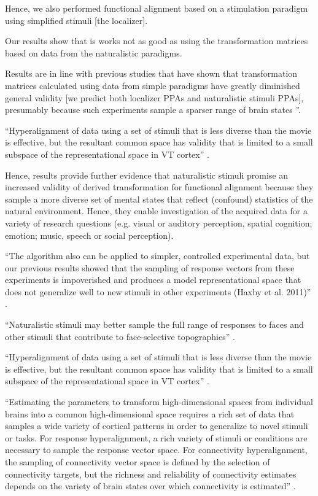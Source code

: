 %
Hence, we also performed functional alignment based on a stimulation paradigm
using simplified stimuli [the localizer].

%
Our results show that is works not as good as using the transformation matrices
based on data from the naturalistic paradigms.

%
Results are in line with previous studies \citep{haxby2011common,
guntupalli2016model} that have shown that transformation matrices calculated
using data from simple paradigms have greatly diminished general validity [we
predict both localizer PPAs and naturalistic stimuli PPAs], presumably because
such experiments sample a sparser range of brain states
\citep{guntupalli2016model}''.

%
``Hyperalignment of data using a set of stimuli that is less diverse than the
movie is effective, but the resultant common space has validity that is limited
to a small subspace of the representational space in VT cortex''
\citep{haxby2011common}.

%
Hence, results provide further evidence that naturalistic stimuli promise an
increased validity of derived transformation for functional alignment
%
because they sample a more diverse set of mental states that reflect (confound)
statistics of the natural environment.
%
Hence, they enable investigation of the acquired data for a variety of research
questions (e.g.  visual or auditory perception, spatial cognition; emotion;
music, speech or social perception).

%
``The algorithm also can be applied to simpler, controlled experimental data,
but our previous results showed that the sampling of response vectors from these
experiments is impoverished and produces a model representational space that
does not generalize well to new stimuli in other experiments (Haxby et al.
2011)'' \citep{guntupalli2016model}.

%
``Naturalistic stimuli may better sample the full range of responses to faces
and other stimuli that contribute to face-selective topographies''
\citep{jiahui2020predicting}.

%
``Hyperalignment of data using a set of stimuli that is less diverse than the
movie is effective, but the resultant common space has validity that is limited
to a small subspace of the representational space in VT cortex''
\citep{haxby2011common}.

%
``Estimating the parameters to transform high-dimensional spaces from individual
brains into a common high-dimensional space requires a rich set of data that
samples a wide variety of cortical patterns in order to generalize to novel
stimuli or tasks.
%
For response hyperalignment, a rich variety of stimuli or conditions are
necessary to sample the response vector space.
%
For connectivity hyperalignment, the sampling of connectivity vector space is
defined by the selection of connectivity targets, but the richness and
reliability of connectivity estimates depends on the variety of brain states
over which connectivity is estimated'' \citep{haxby2020hyperalignment}.

